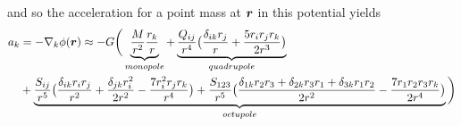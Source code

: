 and so the acceleration for a point mass at $\boldsymbol{r}$ in this potential yields
\begin{align}
\label{eq:mpacc}
a_{k} &= - \nabla_{k} \phi(\boldsymbol{r}) \approx - G \bigg(
\underbrace{ \frac{M}{r^{2}} \frac{r_{k}}{r} }_{monopole}+ 
\underbrace{ \frac{Q_{i j}}{r^{4}}
\big( \frac{\delta_{i k} r_{j} }{r} + \frac{5 r_{i} r_{j} r_{k} }{2r^{3}} \big)
}_{quadrupole} \nonumber \\
&+ \underbrace{ \frac{S_{i j}}{r^{5}}
\big( \frac{ \delta_{i k} r_{i} r_{j} }{r^{2}}
+ \frac{ \delta_{j k} r_{i}^{2} }{2 r^{2} }
- \frac{7 r_{i}^{2} r_{j} r_{k} }{r^{4} } \big) 
 + \frac{S_{1 2 3}}{r^{5} }
\big( \frac{\delta_{1 k} r_{2} r_{3} + \delta_{2 k} r_{3} r_{1} + \delta_{3 k} r_{1} r_{2}}{2 r^{2}} 
- \frac{7 r_{1} r_{2} r_{3} r_{k} }{2 r^{4}}\big) 
}_{octupole}
\bigg)
\end{align}

